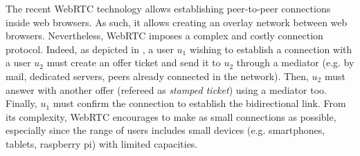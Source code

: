 The recent WebRTC technology allows establishing peer-to-peer connections inside
web browsers. As such, it allows creating an overlay network between web
browsers. Nevertheless, WebRTC imposes a complex and costly connection protocol.
Indeed, as depicted in , a user $u_1$ wishing to establish a
connection with a user $u_2$ must create an offer ticket and send it to $u_2$
through a mediator (e.g. by mail, dedicated servers, peers already connected in
the network). Then, $u_2$ must answer with another offer (refereed as
\emph{stamped ticket}) using a mediator too. Finally, $u_1$ must confirm the
connection to establish the bidirectional link. From its complexity, WebRTC
encourages to make as small connections as possible, especially since the range
of users includes small devices (e.g. smartphones, tablets, raspberry pi) with
limited capacities.

